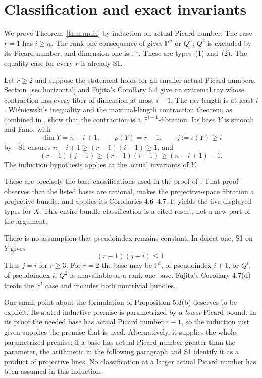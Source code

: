 \documentclass[11pt]{article}
\theoremstyle{definition}\newtheorem{definition}[theorem]{Definition}
\theoremstyle{remark}\newtheorem{remark}[theorem]{Remark}
\newcommand{\PP}{\mathbb P}
\newcommand{\ii}{\iota}
\begin{document}
\section{Classification and exact invariants}\label{sec:classification}
We prove Theorem~\ref{thm:main} by induction on actual Picard number. The
case $r=1$ has $i\ge n$. The rank-one consequence of
\cite[Theorem 1.3]{dh} gives $\PP^n$ or $Q^n$; $Q^2$ is excluded by its
Picard number, and dimension one is $\PP^1$. These are types~(1) and~(2).
The equality case for every $r$ is already S1.

Let $r\ge2$ and suppose the statement holds for all smaller actual Picard
numbers. Section~\ref{sec:horizontal} and Fujita's Corollary 6.4 give an
extremal ray whose contraction has every fiber of dimension at most $i-1$.
The ray length is at least $i$. Wi\'sniewski's inequality and the
maximal-length contraction theorem, as combined in
\cite[Theorems 5.1--5.2]{fujita}, show that the contraction is a
$\PP^{i-1}$-fibration. Its base $Y$ is smooth and Fano, with
\begin{equation}\label{eq:base}
 \dim Y=n-i+1,\qquad \rho(Y)=r-1,\qquad j:=\ii(Y)\ge i
\end{equation}
by \cite[Lemma 4.2]{fujita}. S1 ensures
$n-i+1\ge(r-1)(i-1)\ge1$, and
\[
 (r-1)(j-1)\ge(r-1)(i-1)\ge (n-i+1)-1.
\]
The induction hypothesis applies at the actual invariants of $Y$.

These are precisely the base classifications used in the proof of
\cite[Proposition 5.3(b)]{fujita}. That proof observes that the listed bases
are rational, makes the projective-space fibration a projective bundle,
and applies its Corollaries 4.6--4.7. It yields the five displayed types for
$X$. This entire bundle classification is a cited result, not a new part
of the argument.

There is no assumption that pseudoindex remains constant. In defect one,
S1 on $Y$ gives
\[
 (r-1)(j-i)\le1.
\]
Thus $j=i$ for $r\ge3$. For $r=2$ the base may be $\PP^i$, of pseudoindex
$i+1$, or $Q^i$, of pseudoindex $i$; $Q^2$ is unavailable as a rank-one
base. Fujita's Corollary 4.7(d) treats the $\PP^i$ case and includes both
nontrivial bundles.

One small point about the formulation of Proposition 5.3(b) deserves to be
explicit. Its stated inductive premise is parametrized by a \emph{lower}
Picard bound. In its proof the needed base has actual Picard number $r-1$,
so the induction just given supplies the premise that is used. Alternatively,
it supplies the whole parametrized premise: if a base has actual Picard
number greater than the parameter, the arithmetic in the following paragraph
and S1 identify it as a product of projective lines. No classification at a
larger actual Picard number has been assumed in this induction.
\end{document}
